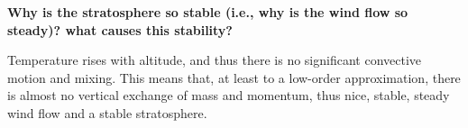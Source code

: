\textbf{Why is the stratosphere so stable (i.e., why is the wind flow so
steady)? what causes this stability?}

Temperature rises with altitude, and thus there is no significant
convective motion and mixing. This means that, at least to a low-order
approximation, there is almost no vertical exchange of mass and
momentum, thus nice, stable, steady wind flow and a stable stratosphere.
